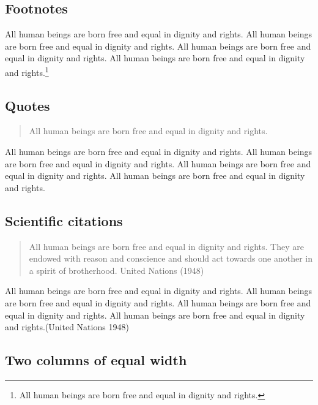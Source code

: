 \documentclass[
]{beamer}
\begin{document}
\subsection{Footnotes}\label{footnotes}

All human beings are born free and equal in dignity and rights. All
human beings are born free and equal in dignity and rights. All human
beings are born free and equal in dignity and rights. All human beings
are born free and equal in dignity and rights.\footnote{All human beings
  are born free and equal in dignity and rights.}

\subsection{Quotes}\label{quotes}

\begin{quote}
All human beings are born free and equal in dignity and rights.
\end{quote}

All human beings are born free and equal in dignity and rights. All
human beings are born free and equal in dignity and rights. All human
beings are born free and equal in dignity and rights. All human beings
are born free and equal in dignity and rights.

\subsection{Scientific citations}\label{scientific-citations}

\begin{otherlanguage}{english}

\begin{quote}
All human beings are born free and equal in dignity and rights. They are
endowed with reason and conscience and should act towards one another in
a spirit of brotherhood. United Nations (1948)
\end{quote}

\end{otherlanguage}

All human beings are born free and equal in dignity and rights. All
human beings are born free and equal in dignity and rights. All human
beings are born free and equal in dignity and rights. All human beings
are born free and equal in dignity and rights.(United Nations 1948)

\subsection{Two columns of equal
width}\label{two-columns-of-equal-width}
\end{document}
